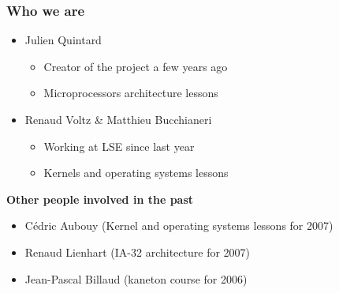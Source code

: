 \begin{frame}
  \frametitle{Who we are}

  \begin{itemize}
    \item
      Julien Quintard
      \begin{itemize}
	\item
	Creator of the project a few years ago
        \item
	Microprocessors architecture lessons
      \end{itemize}
    \item
      Renaud Voltz \& Matthieu Bucchianeri
      \begin{itemize}
	\item
	Working at LSE since last year
	\item
	Kernels and operating systems lessons
      \end{itemize}
  \end{itemize}

  \nl

  \textbf{Other people involved in the past}

  \begin{itemize}
    \item
      C\'{e}dric Aubouy (Kernel and operating systems lessons for 2007)
    \item
      Renaud Lienhart (IA-32 architecture for 2007)
    \item
      Jean-Pascal Billaud (kaneton course for 2006)
  \end{itemize}

\end{frame}


